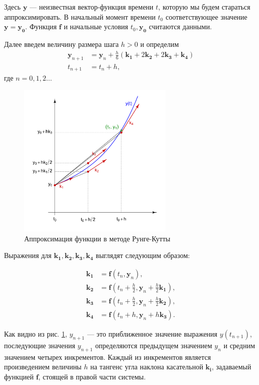 \documentclass{article}
\begin{document}
Здесь $\boldsymbol{y}$ --- неизвестная вектор-функция времени $t$, которую мы будем стараться аппроксимировать. В начальный момент времени $t_0$ соответствующее значение $\boldsymbol{y} = \boldsymbol{y_0}.$ Функция $\boldsymbol{f}$ и начальные условия $t_0, \boldsymbol{y_0}$ считаются данными.

Далее введем величину размера шага $h > 0$ и определим
\begin{align*}
\boldsymbol{y}_{n+1} &= \boldsymbol{y}_n + \frac{h}{6}(\boldsymbol{k_1} + 2\boldsymbol{k_2} + 2\boldsymbol{k_3} + \boldsymbol{k_4})\\
t_{n+1} &= t_n + h,
\end{align*}
где $n = 0,1,2 \ldots$ 

\begin{figure}[h]
\centering
\includegraphics[width=20em,height=20em]{images/runge-kutta_slopes.pdf}
\caption{Аппроксимация функции в методе Рунге-Кутты \cite{ref8}}
\label{fig:runge-kutta}
\end{figure} 
Выражения для $\boldsymbol{k_1},\boldsymbol{k_2},\boldsymbol{k_3},\boldsymbol{k_4}$ выглядят следующим образом: 

\begin{align*}
\boldsymbol{k_1} &= \boldsymbol{f}(t_n,\boldsymbol{y}_n),\\
\boldsymbol{k_2} &= \boldsymbol{f}(t_n + \frac{h}{2}, \boldsymbol{y}_n + \frac{h}{2}\boldsymbol{k_1}),\\
\boldsymbol{k_3} &= \boldsymbol{f}(t_n + \frac{h}{2}, \boldsymbol{y}_n + \frac{h}{2}\boldsymbol{k_2}),\\
\boldsymbol{k_4} &= \boldsymbol{f}(t_n + h,\boldsymbol{y}_n+h\boldsymbol{k_3}).
\end{align*}

Как видно из рис. \ref{fig:runge-kutta}, $y_{n+1}$ --- это приближенное значение выражения $y(t_{n+1})$, последующие значения $y_{n+1}$ определяются предыдущем значением $y_{n}$ и средним значением четырех инкрементов. Каждый из инкрементов является произведением величины $h$ на тангенс угла наклона касательной $\boldsymbol{k_i}$, задаваемый функцией $\boldsymbol{f}$, стоящей в правой части системы.  
\end{document}
